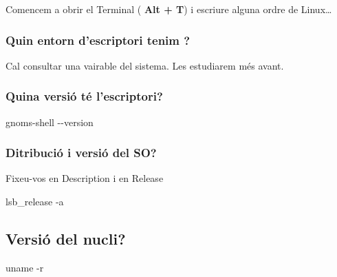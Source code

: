 \documentclass[
  12 pt,
  a4paper,
]{article}
\newenvironment{Shaded}{\begin{snugshade}}{\end{snugshade}}
\newcommand{\NormalTok}[1]{#1}
\begin{document}
Comencem a obrir el Terminal ( \textbf{Alt + T}) i escriure alguna ordre
de Linux\ldots{}

\subsubsection{Quin entorn d'escriptori tenim
?}\label{quin-entorn-descriptori-tenim}

Cal consultar una vairable del sistema. Les estudiarem més avant.

\begin{Shaded}
\end{Shaded}

\subsubsection{Quina versió té
l'escriptori?}\label{quina-versiuxf3-tuxe9-lescriptori}

\begin{Shaded}
\begin{Highlighting}[]
\NormalTok{gnoms{-}shell {-}{-}version}
\end{Highlighting}
\end{Shaded}

\subsubsection{Ditribució i versió del
SO?}\label{ditribuciuxf3-i-versiuxf3-del-so}

Fixeu-vos en Description i en Release

\begin{Shaded}
\begin{Highlighting}[]
\NormalTok{lsb\_release {-}a}
\end{Highlighting}
\end{Shaded}

\subsection{Versió del nucli?}\label{versiuxf3-del-nucli}

\begin{Shaded}
\begin{Highlighting}[]
\NormalTok{uname {-}r}
\end{Highlighting}
\end{Shaded}
\end{document}
